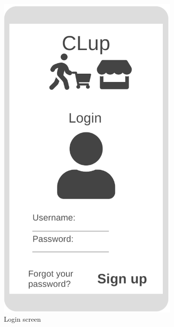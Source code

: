 \begin{figure}[h!]
	\centering
	\begin{subfigure}[b]{0.3\textwidth}
		\includegraphics[width=\linewidth]{../Diagrams/WireframesCLup/Login.png}
		\caption{Login screen}
		\label{fig:WfLogin}
	\end{subfigure}
	\hfill
	\begin{subfigure}[b]{0.3\textwidth}

\end{subfigure}
\end{figure}
